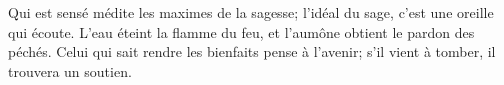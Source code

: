 Qui est sensé médite les maximes de la sagesse;
	l’idéal du sage, c’est une oreille qui écoute.
L’eau éteint la flamme du feu,
	et l’aumône obtient le pardon des péchés.
Celui qui sait rendre les bienfaits pense à l’avenir;
	s’il vient à tomber, il trouvera un soutien.
